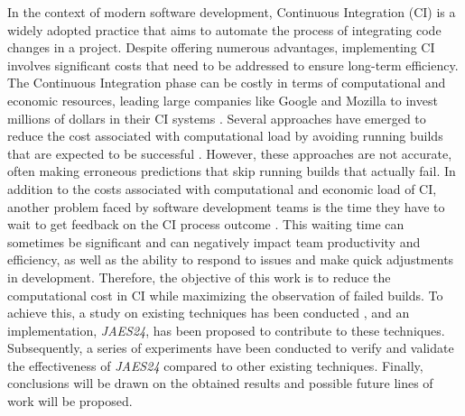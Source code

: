 In the context of modern software development, Continuous Integration (CI) is a widely adopted
practice that aims to automate the process of integrating code changes in a project. Despite
offering numerous advantages, implementing CI involves significant costs that need to be addressed
to ensure long-term efficiency. The Continuous Integration phase can be costly in terms of
computational and economic resources, leading large companies like Google and Mozilla to invest
millions of dollars in their CI systems \cite{1}. Several approaches have emerged to reduce the
cost associated with computational load by avoiding running builds that are expected to be
successful \cite{2}. However, these approaches are not accurate, often making erroneous
predictions that skip running builds that actually fail. In addition to the costs associated with
computational and economic load of CI, another problem faced by software development teams is the
time they have to wait to get feedback on the CI process outcome \cite{3}. This waiting time can
sometimes be significant and can negatively impact team productivity and efficiency, as well as
the ability to respond to issues and make quick adjustments in development. Therefore, the
objective of this work is to reduce the computational cost in CI while maximizing the observation
of failed builds. To achieve this, a study on existing techniques has been conducted
\cite{2,4,5,6,7,8}, and an implementation, \textit{JAES24}, has been proposed to contribute to
these techniques. Subsequently, a series of experiments have been conducted to verify and validate
the effectiveness of \textit{JAES24} compared to other existing techniques. Finally, conclusions
will be drawn on the obtained results and possible future lines of work will be proposed.

\vspace{0.5cm}

\vfill
